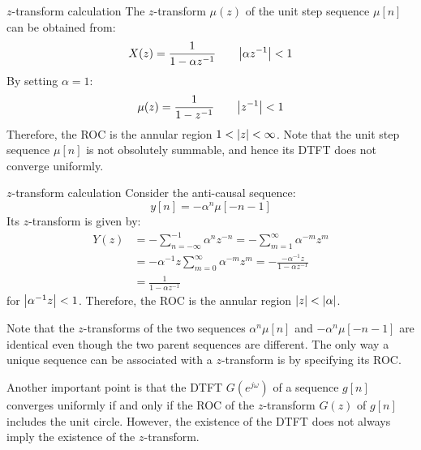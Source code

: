 \documentclass[../../main/main.tex]{subfiles}
\begin{document}
\begin{example}{\boldmath\( z \)-transform calculation}{}
    The \( z \)-transform \( \mu(z) \) of the unit step sequence \( \mu[n] \) can be obtained from:
    \begin{equation}
        X(z)
        =
        \frac{1}{1 - \alpha z^{-1}}
        \qquad
        \abs{\alpha z^{-1}} < 1
        \label{eq:L14_S11_1}
    \end{equation}
    By setting \( \alpha = 1 \):
    \begin{equation}
        \mu(z)
        =
        \frac{1}{1 - z^{-1}}
        \qquad
        \abs{z^{-1}} < 1
        \label{eq:L14_S11_2}
    \end{equation}
    Therefore, the ROC is the annular region \( 1 < \abs{z} < \infty \). Note that the unit step sequence \( \mu[n] \) is not obsolutely summable, and hence its DTFT does not converge uniformly.
\end{example}

\begin{example}{\boldmath\( z \)-transform calculation}{}
    Consider the anti-causal sequence:
    \begin{equation}
        y[n]
        =
        - \alpha^{n} \mu[-n-1]
        \label{eq:L14_S12_1}
    \end{equation}
    Its \( z \)-transform is given by:
    \begin{align}
        Y(z)
        &=
            - \sum_{n=-\infty}^{-1} \alpha^{n} z^{-n}
            =
            - \sum_{m=1}^{\infty} \alpha^{-m} z^{m} \nonumber   \\
        &=
            - \alpha^{-1} z \sum_{m=0}^{\infty} \alpha^{-m} z^{m}
            =
            - \frac{- \alpha^{-1} z}{1 - \alpha z^{-1}} \nonumber   \\
        &=
            \frac{1}{1 - \alpha z^{-1}}
    \end{align}
    for \( \abs{\alpha^{-1}z} < 1 \). Therefore, the ROC is the annular region \( \abs{z} < \abs{\alpha} \).
\end{example}

Note that the \( z \)-transforms of the two sequences \( \alpha^{n} \mu[n] \) and \( - \alpha^{n} \mu[-n-1] \) are identical even though the two parent sequences are different. The only way a unique sequence can be associated with a \( z \)-transform is by specifying its ROC.

Another important point is that the DTFT \( G(e^{j\omega}) \) of a sequence \( g[n] \) converges uniformly if and only if the ROC of the \( z \)-transform \( G(z) \) of \( g[n] \) includes the unit circle. However, the existence of the DTFT does not always imply the existence of the \( z \)-transform.
\end{document}
